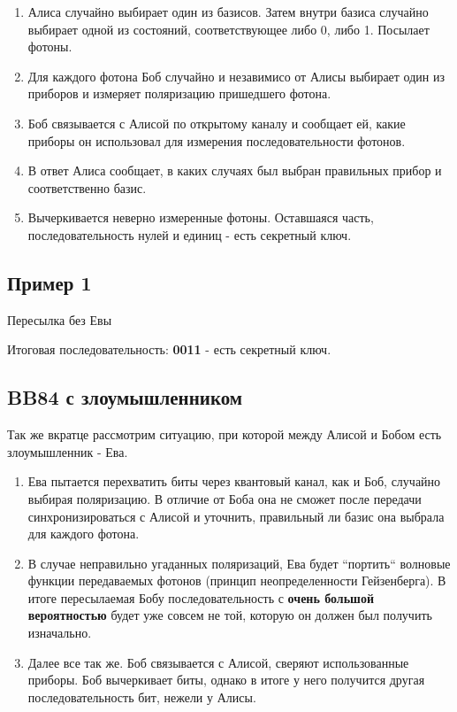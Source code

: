 \begin{enumerate}
    \item Алиса случайно выбирает один из базисов. Затем внутри базиса случайно выбирает одной из состояний, соответствующее либо 0, либо 1. Посылает фотоны. 
    \item Для каждого фотона Боб случайно и незавимисо от Алисы выбирает один из приборов и измеряет поляризацию пришедшего фотона. 
    \item Боб связывается с Алисой по открытому каналу и сообщает ей, какие приборы он использовал для измерения последовательности фотонов.
    \item В ответ Алиса сообщает, в каких случаях был выбран правильных прибор и соответственно базис. 
    \item Вычеркивается неверно измеренные фотоны. Оставшаяся часть, последовательность нулей и единиц - есть секретный ключ. 
\end{enumerate}

\subsection{Пример 1}

\begin{table}[h!]
    \centering
    
    \caption{Пересылка без Евы}
    \label{tb2}
\end{table}

Итоговая последовательность: \textbf{0011} - есть секретный ключ.

\subsection{BB84 с злоумышленником}

Так же вкратце рассмотрим ситуацию, при которой между Алисой и Бобом есть злоумышленник - Ева. 

\begin{enumerate}
    \item Ева пытается перехватить биты через квантовый канал, как и Боб, случайно выбирая поляризацию. В отличие от Боба она не сможет после передачи синхронизироваться с Алисой и уточнить, правильный ли базис она выбрала для каждого фотона. 
    \item В случае неправильно угаданных поляризаций, Ева будет ``портить`` волновые функции передаваемых фотонов (принцип неопределенности Гейзенберга). В итоге пересылаемая Бобу последовательность с \textbf{очень большой вероятностью} будет уже совсем не той, которую он должен был получить изначально. 
    \item Далее все так же. Боб связывается с Алисой, сверяют использованные приборы. Боб вычеркивает биты, однако в итоге у него получится другая последовательность бит, нежели у Алисы. 
\end{enumerate}

